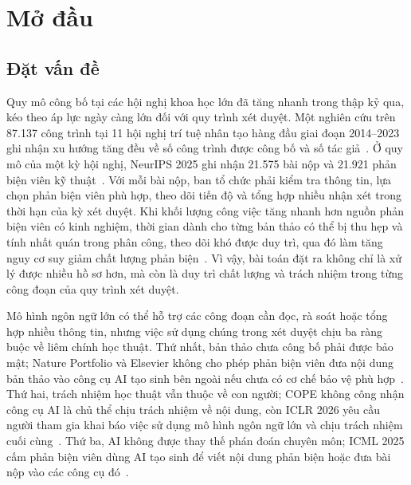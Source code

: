 \chapter{Mở đầu}
\label{Chapter1}

\section{Đặt vấn đề}

Quy mô công bố tại các hội nghị khoa học lớn đã tăng nhanh trong thập kỷ qua, kéo theo áp lực ngày càng lớn đối với quy trình xét duyệt. Một nghiên cứu trên 87.137 công trình tại 11 hội nghị trí tuệ nhân tạo hàng đầu giai đoạn 2014--2023 ghi nhận xu hướng tăng đều về số công trình được công bố và số tác giả~\cite{ch1ref1}. Ở quy mô của một kỳ hội nghị, NeurIPS 2025 ghi nhận 21.575 bài nộp và 21.921 phản biện viên kỹ thuật~\cite{ch1ref2}. Với mỗi bài nộp, ban tổ chức phải kiểm tra thông tin, lựa chọn phản biện viên phù hợp, theo dõi tiến độ và tổng hợp nhiều nhận xét trong thời hạn của kỳ xét duyệt. Khi khối lượng công việc tăng nhanh hơn nguồn phản biện viên có kinh nghiệm, thời gian dành cho từng bản thảo có thể bị thu hẹp và tính nhất quán trong phân công, theo dõi khó được duy trì, qua đó làm tăng nguy cơ suy giảm chất lượng phản biện~\cite{ch1ref10,ch1ref11,ch1ref13}. Vì vậy, bài toán đặt ra không chỉ là xử lý được nhiều hồ sơ hơn, mà còn là duy trì chất lượng và trách nhiệm trong từng công đoạn của quy trình xét duyệt.

Mô hình ngôn ngữ lớn có thể hỗ trợ các công đoạn cần đọc, rà soát hoặc tổng hợp nhiều thông tin, nhưng việc sử dụng chúng trong xét duyệt chịu ba ràng buộc về liêm chính học thuật. Thứ nhất, bản thảo chưa công bố phải được bảo mật; Nature Portfolio và Elsevier không cho phép phản biện viên đưa nội dung bản thảo vào công cụ AI tạo sinh bên ngoài nếu chưa có cơ chế bảo vệ phù hợp~\cite{ch2ref41,ch2ref45}. Thứ hai, trách nhiệm học thuật vẫn thuộc về con người; COPE không công nhận công cụ AI là chủ thể chịu trách nhiệm về nội dung, còn ICLR 2026 yêu cầu người tham gia khai báo việc sử dụng mô hình ngôn ngữ lớn và chịu trách nhiệm cuối cùng~\cite{ch2ref15,ch2ref44}. Thứ ba, AI không được thay thế phán đoán chuyên môn; ICML 2025 cấm phản biện viên dùng AI tạo sinh để viết nội dung phản biện hoặc đưa bài nộp vào các công cụ đó~\cite{ch2ref16}.

